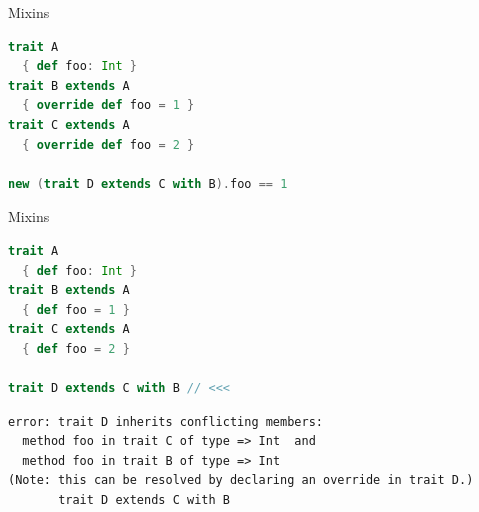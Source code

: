 \documentclass[aspectratio=169]{beamer}
\begin{document}

\begin{frame}[fragile]{Mixins}
\begin{lstlisting}[style=scala,language=scala]
trait A
  { def foo: Int }
trait B extends A 
  { override def foo = 1 }
trait C extends A 
  { override def foo = 2 }
 
new (trait D extends C with B).foo == 1
\end{lstlisting}
\end{frame}

\begin{frame}[fragile]{Mixins}
\begin{lstlisting}[style=scala,language=scala]
trait A
  { def foo: Int }
trait B extends A
  { def foo = 1 }
trait C extends A
  { def foo = 2 }

trait D extends C with B // <<<
\end{lstlisting}
\pause
\begin{verbatim}
error: trait D inherits conflicting members:
  method foo in trait C of type => Int  and
  method foo in trait B of type => Int
(Note: this can be resolved by declaring an override in trait D.)
       trait D extends C with B
\end{verbatim}
\end{frame}

\end{document}
